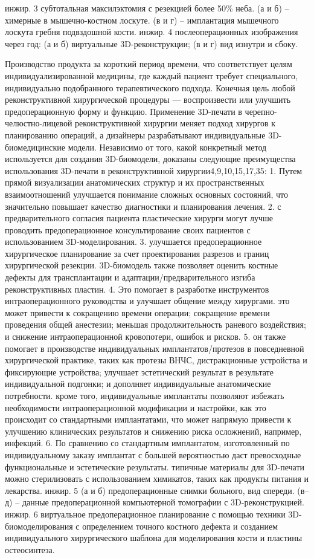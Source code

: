 инжир. 3 субтотальная максилэктомия с резекцией более 50\% неба. (а и б) –
химерные в мышечно-костном лоскуте. (в и г) – имплантация мышечного лоскута
гребня подвздошной кости. инжир. 4 послеоперационных изображения через год: (а и
б) виртуальные 3D-реконструкции; (в и г) вид изнутри и сбоку.

Производство продукта за короткий период времени, что соответствует целям
индивидуализированной медицины, где каждый пациент требует специального,
индивидуально подобранного терапевтического подхода. Конечная цель любой
реконструктивной хирургической процедуры — воспроизвести или улучшить
предоперационную форму и функцию. Применение 3D-печати в
черепно-челюстно-лицевой реконструктивной хирургии меняет подход хирургов к
планированию операций, а дизайнеры разрабатывают индивидуальные
3D-биомедицинские модели. Независимо от того, какой конкретный метод
используется для создания 3D-биомодели, доказаны следующие преимущества
использования 3D-печати в реконструктивной хирургии4,9,10,15,17,35:
1. Путем прямой визуализации анатомических структур и их пространственных
взаимоотношений улучшается понимание сложных основных состояний, что значительно
повышает качество диагностики и планирования лечения.
2. с предварительного согласия пациента пластические хирурги могут лучше
проводить предоперационное консультирование своих пациентов с использованием
3D-моделирования.
3. улучшается предоперационное хирургическое планирование за счет проектирования
разрезов и границ хирургической резекции. 3D-биомодель также позволяет оценить
костные дефекты для трансплантации и адаптации/предварительного изгиба
реконструктивных пластин.
4. Это помогает в разработке инструментов интраоперационного руководства и
улучшает общение между хирургами. это может привести к сокращению времени
операции; сокращение времени проведения общей анестезии; меньшая
продолжительность раневого воздействия; и снижение интраоперационной
кровопотери, ошибок и рисков.
5. он также помогает в производстве индивидуальных имплантатов/протезов в
повседневной хирургической практике, таких как протезы ВНЧС, дистракционные
устройства и фиксирующие устройства; улучшает эстетический результат в
результате индивидуальной подгонки; и дополняет индивидуальные анатомические
потребности. кроме того, индивидуальные имплантаты позволяют избежать
необходимости интраоперационной модификации и настройки, как это происходит со
стандартными имплантатами, что может напрямую привести к улучшению клинических
результатов и снижению риска осложнений, например, инфекций.
6. По сравнению со стандартным имплантатом, изготовленный по индивидуальному
заказу имплантат с большей вероятностью даст превосходные функциональные и
эстетические результаты. типичные материалы для 3D-печати можно стерилизовать с
использованием химикатов, таких как продукты питания и лекарства.
инжир. 5 (а и б) предоперационные снимки больного, вид спереди. (в–д) – данные
предоперационной компьютерной томографии с 3D-реконструкцией. инжир. 6
виртуальное предоперационное планирование с помощью техники 3D-биомоделирования
с определением точного костного дефекта и созданием индивидуального
хирургического шаблона для моделирования кости и пластины
остеосинтеза.

